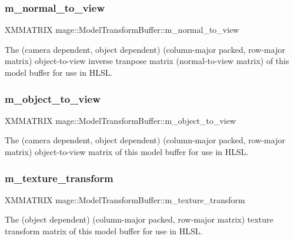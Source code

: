 \subsubsection{\texorpdfstring{m\+\_\+normal\+\_\+to\+\_\+view}{m\_normal\_to\_view}}
{\footnotesize\ttfamily X\+M\+M\+A\+T\+R\+IX mage\+::\+Model\+Transform\+Buffer\+::m\+\_\+normal\+\_\+to\+\_\+view}

The (camera dependent, object dependent) (column-\/major packed, row-\/major matrix) object-\/to-\/view inverse tranpose matrix (normal-\/to-\/view matrix) of this model buffer for use in H\+L\+SL. \hypertarget{structmage_1_1_model_transform_buffer_a637f19de6899ae97fa02e94bb6d52ba6}{}\label{structmage_1_1_model_transform_buffer_a637f19de6899ae97fa02e94bb6d52ba6} 
\subsubsection{\texorpdfstring{m\+\_\+object\+\_\+to\+\_\+view}{m\_object\_to\_view}}
{\footnotesize\ttfamily X\+M\+M\+A\+T\+R\+IX mage\+::\+Model\+Transform\+Buffer\+::m\+\_\+object\+\_\+to\+\_\+view}

The (camera dependent, object dependent) (column-\/major packed, row-\/major matrix) object-\/to-\/view matrix of this model buffer for use in H\+L\+SL. \hypertarget{structmage_1_1_model_transform_buffer_a06ad76c28119e4da55f8bd863715c042}{}\label{structmage_1_1_model_transform_buffer_a06ad76c28119e4da55f8bd863715c042} 
\subsubsection{\texorpdfstring{m\+\_\+texture\+\_\+transform}{m\_texture\_transform}}
{\footnotesize\ttfamily X\+M\+M\+A\+T\+R\+IX mage\+::\+Model\+Transform\+Buffer\+::m\+\_\+texture\+\_\+transform}

The (object dependent) (column-\/major packed, row-\/major matrix) texture transform matrix of this model buffer for use in H\+L\+SL. 